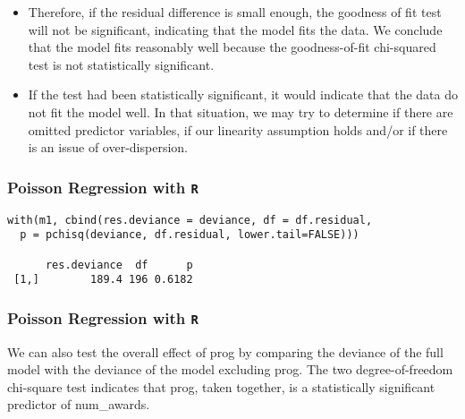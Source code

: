 \documentclass[00-GLMregslides.tex]{subfiles}
\begin{document}
\begin{frame}
	\begin{itemize}
\item Therefore, if the residual difference is small enough, the goodness of fit test will not be significant, indicating that the model fits the data. We conclude that the model fits reasonably well because the goodness-of-fit chi-squared test is not statistically significant. 
\item If the test had been statistically significant, it would indicate that the data do not fit the model well. In that situation, we may try to determine if there are omitted predictor variables, if our linearity assumption holds and/or if there is an issue of over-dispersion. 
\end{itemize}
\end{frame}

\begin{frame}[fragile]

\frametitle{Poisson Regression with \texttt{R}}
\Large

\begin{framed}
\begin{verbatim}
with(m1, cbind(res.deviance = deviance, df = df.residual,
  p = pchisq(deviance, df.residual, lower.tail=FALSE)))
 
      res.deviance  df      p
 [1,]        189.4 196 0.6182
\end{verbatim}
\end{framed}
\end{frame}

\begin{frame}[fragile]

\frametitle{Poisson Regression with \texttt{R}}
\Large 
We can also test the overall effect of prog by comparing the deviance of the full model with the deviance of the model excluding prog. The two degree-of-freedom chi-square test indicates that prog, taken together, is a statistically significant predictor of num\_awards.
 

\end{frame}
\end{document}
